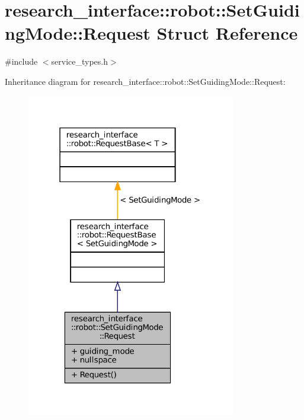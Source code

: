\hypertarget{structresearch__interface_1_1robot_1_1SetGuidingMode_1_1Request}{}\section{research\+\_\+interface\+:\+:robot\+:\+:Set\+Guiding\+Mode\+:\+:Request Struct Reference}
\label{structresearch__interface_1_1robot_1_1SetGuidingMode_1_1Request}


{\ttfamily \#include $<$service\+\_\+types.\+h$>$}



Inheritance diagram for research\+\_\+interface\+:\+:robot\+:\+:Set\+Guiding\+Mode\+:\+:Request\+:
\nopagebreak
\begin{figure}[H]
\begin{center}
\leavevmode
\includegraphics[width=259pt]{structresearch__interface_1_1robot_1_1SetGuidingMode_1_1Request__inherit__graph}
\end{center}
\end{figure}


